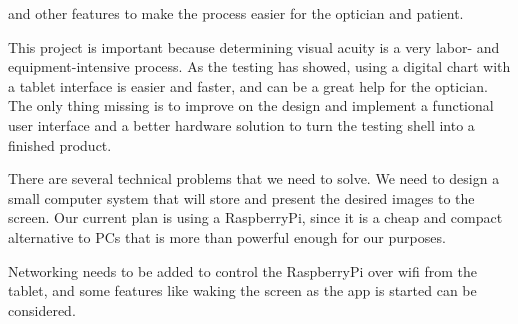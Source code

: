 and other features to make the process easier for the optician and patient.





This project is important because determining visual acuity is a very labor- and equipment-intensive process. As the testing has showed, using a digital chart with a tablet interface is easier and faster, and can be a great help for the optician. The only thing missing is to improve on the design and implement a functional user interface and a better hardware solution to turn the testing shell into a finished product. 









There are several technical problems that we need to solve. We need to design a small computer system that will store and present the desired images to the screen. Our current plan is using a RaspberryPi, since it is a cheap and compact alternative to PCs that is more than powerful enough for our purposes. 

Networking needs to be added to control the RaspberryPi over wifi from the tablet, and some features like waking the screen as the app is started can be considered.

